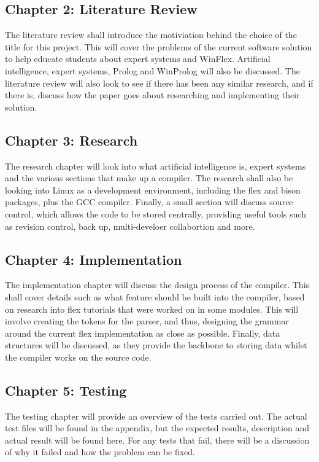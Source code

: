 \documentclass[12pt]{report}
\begin{document}
\subsection{Chapter 2: Literature Review}\label{sec:sub:chapter2}
The literature review shall introduce the motiviation behind the choice of the title for this project.  This will cover the problems of the current software solution to help educate students about expert systems and WinFlex.  Artificial intelligence, expert systems, Prolog and WinProlog will also be discussed.  The literature review will also look to see if there has been any similar research, and if there is, discuss how the paper goes about researching and implementing their solution.
\subsection{Chapter 3: Research}\label{sec:sub:chapter3}
The research chapter will look into what artificial intelligence is, expert systems and the various sections that make up a compiler.  The research shall also be looking into Linux as a development environment, including the  flex and bison packages, plus the GCC compiler.  Finally, a small section will discuss source control, which allows the code to be stored centrally, providing useful tools such as revision control, back up, multi-develoer collabortion and more.
\subsection{Chapter 4: Implementation}\label{sec:sub:chapter4}
The implementation chapter will discuss the design process of the compiler.  This shall cover details such as what feature should be built into the compiler, based on research into flex tutorials that were worked on in some modules.  This will involve creating the tokens for the parser, and thus, designing the grammar around the current flex implementation as close as possible.  Finally, data structures will be discussed, as they provide the backbone to storing data whilst the compiler works on the source code.
\subsection{Chapter 5: Testing}\label{sec:chapter5}
The testing chapter will provide an overview of the tests carried out.  The actual test files will be found in the appendix, but the expected results, description and actual result will be found here.  For any tests that fail, there will be a discussion of why it failed and how the problem can be fixed.
\end{document}
